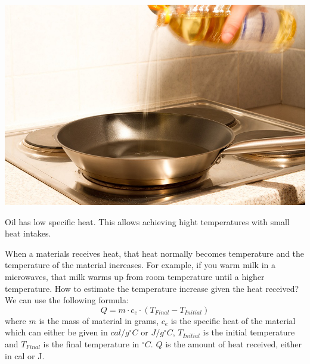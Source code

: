 \documentclass[main.tex]{subfiles}
\begin{document}
\begin{description}
     \begin{marginfigure}[-1cm]
      \includegraphics{chapter2/figure1-5}
      \caption{Oil has low specific heat. This allows achieving hight temperatures with small heat intakes.}
      \label{fig:marginfig}
   \end{marginfigure}
\item[\docfilehook{From heat to temperature}{From heat to temperature}] 
When a materials receives heat, that heat normally becomes temperature and the temperature of the material increases. For example, if you warm milk in a microwaves, that milk warms up from room temperature until a higher temperature. How to estimate the temperature increase given the heat received? We can use the following formula:
\begin{equation}
\boxed{    Q=m\cdot c_e\cdot  (T_{Final}-T_{Initial})   } 
\label{formula2:3}
\end{equation}
where $m$ is the mass of material in grams, $c_e$ is the specific heat of the material which can either be given in $cal/g^{\circ}C$ or $J/g^{\circ}C$, $T_{Initial}$ is the initial temperature and $T_{Final}$ is the final temperature in $^{\circ}C$. $Q$ is the amount of heat received, either in cal or J.



\end{description}
\end{document}
